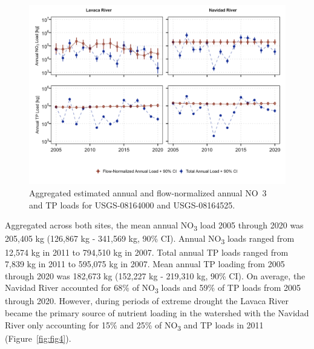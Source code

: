 \documentclass[sn-basic,referee,lineno,pdflatex]{sn-jnl}
\begin{document}
\begin{figure}

{\centering \includegraphics[width=1\linewidth,]{Schramm-2023-05-AS_files/figure-latex/fig3-1} 

}

\caption{Aggregated estimated annual and flow-normalized annual NO~3~ and TP loads for USGS-08164000 and USGS-08164525.}\label{fig:fig3}
\end{figure}

Aggregated across both sites, the mean annual NO\textsubscript{3} load
2005 through 2020 was 205,405 kg (126,867 kg - 341,569 kg, 90\% CI).
Annual NO\textsubscript{3} loads ranged from 12,574 kg in 2011 to
794,510 kg in 2007. Total annual TP loads ranged from 7,839 kg in 2011
to 595,075 kg in 2007. Mean annual TP loading from 2005 through 2020 was
182,673 kg (152,227 kg - 219,310 kg, 90\% CI). On average, the Navidad
River accounted for 68\% of NO\textsubscript{3} loads and 59\% of TP
loads from 2005 through 2020. However, during periods of extreme drought
the Lavaca River became the primary source of nutrient loading in the
watershed with the Navidad River only accounting for 15\% and 25\% of
NO\textsubscript{3} and TP loads in 2011 (Figure~\ref{fig:fig4}).
\end{document}

